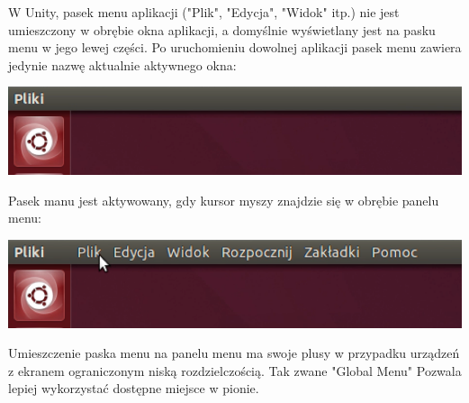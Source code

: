 W Unity, pasek menu aplikacji ("Plik", "Edycja", "Widok" itp.) nie jest umieszczony w obrębie okna aplikacji, a domyślnie wyświetlany jest na pasku menu w jego lewej części. Po uruchomieniu dowolnej aplikacji pasek menu zawiera jedynie nazwę aktualnie aktywnego okna:

\begin{center}
	\includegraphics[scale=0.6]{images/unity_menu_bar2.png}
\end{center}

Pasek manu jest aktywowany, gdy kursor myszy znajdzie się w obrębie panelu menu:

\begin{center}
	\includegraphics[scale=0.6]{images/unity_menu_bar3.png}
\end{center}

Umieszczenie paska menu na panelu menu ma swoje plusy w przypadku urządzeń z ekranem ograniczonym niską rozdzielczością. Tak zwane "Global Menu" Pozwala lepiej wykorzystać dostępne miejsce w pionie.
\clearpage